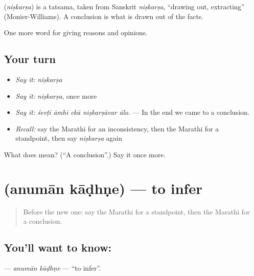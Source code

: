 \begin{cousinweb}
\textbf{} (\emph{niṣkarṣa}) is a tatsama, taken from Sanskrit \emph{niṣkarṣa}, \textquotedblleft{}drawing out, extracting\textquotedblright{} (Monier-Williams). A conclusion is what is drawn out of the facts.
\end{cousinweb}

\begin{grammarlens}[title={What you've built}]
One more word for giving reasons and opinions.
\end{grammarlens}

\subsection*{Your turn}
\begin{itemize}
\raggedright
  \item \emph{Say it:} \emph{niṣkarṣa}
  \item \emph{Say it:} \emph{niṣkarṣa}, once more
  \item \emph{Say it:} \emph{śevṭī āmhī ekā niṣkarṣāvar ālo.} — In the end we came to a conclusion.
  \item \emph{Recall:} say the Marathi for an inconsistency, then the Marathi for a standpoint, then say \emph{niṣkarṣa} again
\end{itemize}

\begin{tcolorbox}[breakable,colback=teal!4,colframe=teal!35!black,title={Before you move on}]
What does  mean? (\textquotedblleft{}A conclusion\textquotedblright{}.) Say it once more.
\end{tcolorbox}
\section[\texorpdfstring{\mr{अनुमान} \mr{काढणे} (anumān kāḍhṇe)}{अनुमान काढणे (anumān kāḍhṇe)}]{  (anumān kāḍhṇe) — to infer}

\label{lesson:MR-C345-anuman-kadhne}



\begin{quote}
Before the new one: say the Marathi for a standpoint, then the Marathi for a conclusion.
\end{quote}

\subsection*{You'll want to know:  }
\textbf{ } — \emph{anumān kāḍhṇe} — \textquotedblleft{}to infer\textquotedblright{}.

